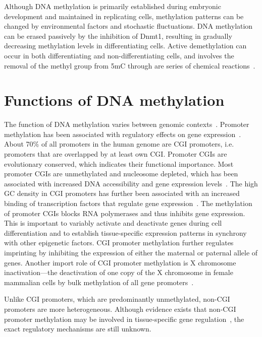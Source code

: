 Although DNA methylation is primarily established during embryonic development and maintained in replicating cells, methylation patterns can be changed by environmental factors and stochastic fluctuations. DNA methylation can be erased passively by the inhibition of Dnmt1, resulting in gradually decreasing methylation levels in differentiating cells. Active demethylation can occur in both differentiating and non-differentiating cells, and involves the removal of the methyl group from 5mC through are series of chemical reactions~\citep{mayer_embryogenesis:_2000,zhang_active_2007}.

\section{Functions of DNA methylation} \label{sec:intro_fun}

The function of DNA methylation varies between genomic contexts~\citep{bestor_notes_2015,moore_dna_2013,jones_functions_2012,bird_dna_2002}. Promoter methylation has been associated with regulatory effects on gene expression~\citep{moore_dna_2013,jones_functions_2012,bird_dna_2002}. About 70\% of all promoters in the human genome are CGI promoters, i.e. promoters that are overlapped by at least own CGI. Promoter CGIs are evolutionary conserved, which indicates their functional importance. Most promoter CGIs are unmethylated and nucleosome depleted, which has been associated with increased DNA accessibility and gene expression levels~\citep{moore_dna_2013}. The high GC density in CGI promoters has further been associated with an increased binding of transcription factors that regulate gene expression~\citep{moore_dna_2013}. The methylation of promoter CGIs blocks RNA polymerases and thus inhibits gene expression. This is important to variably activate and deactivate genes during cell differentiation and to establish tissue-specific expression patterns in synchrony with other epigenetic factors. CGI promoter methylation further regulates imprinting by inhibiting the expression of either the maternal or paternal allele of genes. Another import role of CGI promoter methylation is X chromosome inactivation—the deactivation of one copy of the X chromosome in female mammalian cells by bulk methylation of all gene promoters~\citep{bestor_notes_2015}.

Unlike CGI promoters, which are predominantly unmethylated, non-CGI promoters are more heterogeneous. Although evidence exists that non-CGI promoter methylation may be involved in tissue-specific gene regulation~\citep{moore_dna_2013,jones_functions_2012}, the exact regulatory mechanisms are still unknown.

